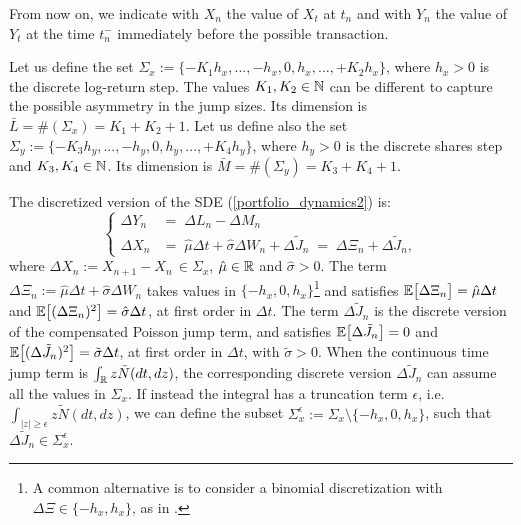 From now on, we indicate with $X_n$ the value of $X_{t}$ at $t_n$ and with $Y_n$ the value of $Y_{t}$ at the time $t^-_n$ 
immediately before the possible transaction. %

Let us define the set $\Sigma_x := \{-K_1 h_x , ... , -h_x,0,h_x, ... , +K_2 h_x \}$,  
where $h_x>0$ is the discrete log-return step. The values $K_1,K_2 \in \mathbb{N}$ can be 
different to capture the possible asymmetry in the jump sizes. Its dimension is $\bar L = \#(\Sigma_x) = K_1 + K_2 +1$.
Let us define also the set $\Sigma_y := \{-K_3 h_y , ... , -h_y,0,h_y, ... , + K_4 h_y \} $, 
where $h_y>0$ is the discrete shares step and $K_3,K_4 \in \mathbb{N}$. Its dimension is $\bar M = \#(\Sigma_y) = K_3+K_4+1$.

The discretized version of the SDE (\ref{portfolio_dynamics2}) is: 
\begin{equation}\label{log_sde_discr}
 \begin{cases}
 \Delta Y_n &= \; \Delta L_n - \Delta M_n \\
 \Delta X_n &= \; \hat \mu  \Delta t + \hat \sigma \Delta W_n + \Delta \tilde J_n \; = \; \Delta \Xi_n + \Delta \tilde J_n,
\end{cases}
\end{equation} 
where $\Delta X_n := X_{n+1} - X_{n} \, \in \Sigma_x$, $\hat \mu \in \mathbb{R}$ and $\hat \sigma > 0$. 
The term $\Delta \Xi_n := \hat \mu  \Delta t + \hat \sigma \Delta W_n$ takes values in $\{ -h_x, 0, h_x\}$\footnote{A common alternative is to consider a binomial discretization 
with $\Delta \Xi \in \{-h_x,h_x\}$, as in \cite{DaPaZa93}. }
and satisfies $\mathbb{E}\bigl[\Delta \Xi_n\bigr] = \hat \mu  \Delta t$ and $\mathbb{E}\bigl[(\Delta \Xi_n)^2\bigr] = \hat \sigma \Delta t$, at first order in $\Delta t$.  
The term $\Delta \tilde J_n$ is the discrete version of the compensated Poisson jump term, and satisfies $\mathbb{E}\bigl[\Delta \tilde J_n\bigr] = 0$ and 
$\mathbb{E}\bigl[(\Delta \tilde J_n)^2\bigr] = \tilde \sigma \Delta t$, at first order in $\Delta t$, with $\tilde \sigma > 0$. 
When the continuous time jump term is $\int_{\mathbb{R}} z \tilde N(dt,dz)$, 
the corresponding discrete version $\Delta \tilde J_n$ can assume all the values in $ \Sigma_x $.
If instead the integral has a truncation term $\epsilon$, i.e. $\int_{|z| \geq \epsilon} z \tilde N(dt,dz)$, we can define the subset 
$ \Sigma^{\epsilon}_x := \Sigma_x \setminus \{ -h_x, 0, h_x\}$, such that $\Delta \tilde J_n \in \Sigma^{\epsilon}_x$.

